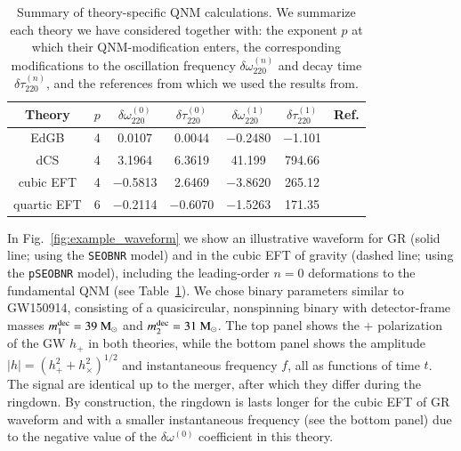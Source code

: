 \documentclass[twocolumn,
               prd,
               aps,
               superscriptaddress,
               tightenlines,
               nofootinbib,
               eqsecnum,
               amsfonts,
               amsmath,
               longbibliography]{revtex4-1}
\newcommand{\pSEOB}{\texttt{pSEOBNR}}
\newcommand{\msun}{~{\rm M}_{\odot}}
\begin{document}
\begin{table}[t]
\begin{tabular}{c | c c c c c c}
\hline
\hline
Theory & $p$ & $\delta \omega^{(0)}_{220}$ & $\delta \tau^{(0)}_{220}$ & $\delta \omega^{(1)}_{220}$ & $\delta \tau^{(1)}_{220}$ & Ref.  \\
\hline
EdGB        & 4 & 0.0107    & 0.0044    & $-$0.2480 & $-$1.101 &  \cite{Blazquez-Salcedo:2016enn,Pierini:2021jxd} \\
dCS         & 4 & 3.1964    & 6.3619    & 41.199    & 794.66   &  \cite{Wagle:2021tam}  \\
cubic EFT   & 4 & $-$0.5813 & 2.6469    & $-$3.8620 & 265.12   & \cite{Cano:2021myl} \\
quartic EFT & 6 & $-$0.2114 & $-$0.6070 & $-$1.5263 & 171.35   & \cite{Cano:2021myl}  \\
\hline
\hline
\end{tabular}
\caption{Summary of theory-specific QNM calculations.
%
We summarize each theory we have considered together with: the exponent $p$ at
which their QNM-modification enters, the corresponding modifications to the
oscillation frequency $\delta \omega^{(n)}_{220}$ and decay time $\delta \tau^{(n)}_{220}$, and the
references from which we used the results from.
}
\label{tab:ref_theories_qnms}
\end{table}

In Fig.~\ref{fig:example_waveform} we show an illustrative waveform for GR (solid line; using the \texttt{SEOBNR} model) and in the cubic EFT of gravity (dashed line; using the \pSEOB{} model),
including the leading-order $n = 0$ deformations to the fundamental QNM (see Table~\ref{tab:ref_theories_qnms}).
%
We chose binary parameters similar to GW150914, consisting of a quasicircular,
nonspinning binary with detector-frame masses
$m_1^{\rm dec} = 39\msun$ and $m_2^{\rm dec} = 31\msun$.
%
The top panel shows the $+$ polarization of the GW $h_{+}$ in both theories,
while the bottom panel shows the amplitude $|h| = (h_{+}^2 + h_{\times}^2)^{1/2}$
and instantaneous frequency $f$, all as functions of time $t$.
%
The signal are identical up to the merger, after which they differ during the ringdown.
%
By construction, the ringdown is lasts longer for the cubic EFT of GR waveform and
with a smaller instantaneous frequency (see the bottom panel) due to the negative value of the
$\delta\omega^{(0)}$ coefficient in this theory.
\end{document}
